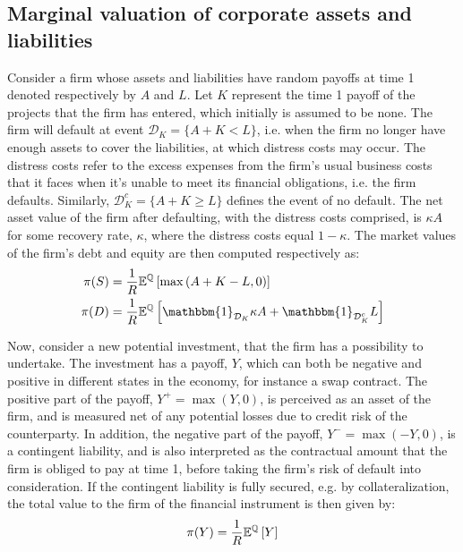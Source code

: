 \documentclass[../main.tex]{subfiles}
\begin{document}
    \subsection{Marginal valuation of corporate assets and liabilities}
        Consider a firm whose assets and liabilities have random payoffs at time 1 denoted respectively by $A$ and $L$.  
        Let $K$ represent the time 1 payoff of the projects that the firm has entered, which initially is assumed to be none.      
        The firm will default at event $\mathcal{D}_K=\{A + K<L\}$, i.e. when the firm no longer have enough assets to cover the liabilities, at which distress costs may occur.
        The distress costs refer to the excess expenses from the firm's usual business costs
        that it faces when it's unable to meet its financial obligations, i.e. the firm defaults.
        Similarly, $\mathcal{D}_{K}^c = \{A + K \geq L\}$ defines the event of no default.
        The net asset value of the firm after defaulting, with the distress costs comprised, is $\kappa A$ for some recovery rate, $\kappa$, where the distress costs equal $1-\kappa$.
        The market values of the firm's debt and equity are then computed respectively as:
        \begin{align}
            \pi(S) &= \discountfactor \mathbb{E}^{\mathbb{Q}}\left[\max\left(A+K-L,0\right)\right]\\
            \pi(D) &= \discountfactor \mathbb{E}^{\mathbb{Q}}\left[\mathbbm{1}_{\mathcal{D}_{K}}\kappa A + \mathbbm{1}_{\mathcal{D}_{K}^c}L\right]
        \end{align}

        Now, consider a new potential investment, that the firm has a possibility to undertake.
        The investment has a payoff, $Y$, which can both be negative and positive in different states in the economy, for instance a swap contract.
        The positive part of the payoff, $Y^{+}=\max\left(Y,0\right)$, is perceived as an asset of the firm, and is measured net of any potential losses due to credit risk of the counterparty.
        In addition, the negative part of the payoff, $Y^{-} = \max \left(-Y,0\right)$, is a contingent liability, and is also interpreted as the contractual amount that the firm is obliged to pay at time 1, before taking the firm's risk of default into consideration.
        If the contingent liability is fully secured, e.g. by collateralization, the total value to the firm of the financial instrument is then given by:
        \begin{equation}
            \pi(Y) = \frac{1}{R} \mathbb{E}^{\mathbb{Q}} \left[Y\right]
        \end{equation}
\end{document}
